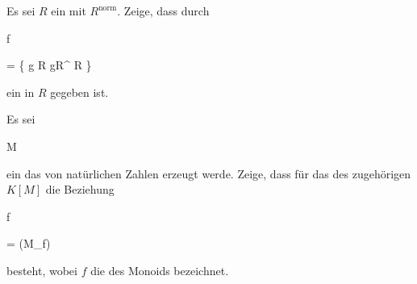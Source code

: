 {} {}



{}

{


Es sei $R$ ein
mit
$R ^{\operatorname{norm} }$. Zeige, dass durch


\mavergleichskettedisp

{\vergleichskette

{ {\mathfrak f}
}

{ =} { \left\{  g \in R   \mid   gR^{ } \subseteq R         \right\}
}

{ } {
}

{ } {
}

{ } {
}

}
{}{}{}
ein
in $R$ gegeben ist.


}

{} {}



{}

{


Es sei


\mavergleichskette

{\vergleichskette

{ M
}

{ \subseteq }{ \N
}

{  }{
}

{    }{
}

{   }{
}

}
{}{}{}
ein
das von
natürlichen Zahlen erzeugt werde. Zeige, dass für das
des zugehörigen
$K[M]$ die Beziehung


\mavergleichskettedisp

{\vergleichskette

{ {\mathfrak f}
}

{ =} { (M_{\geq f})
}

{ } {
}

{ } {
}

{ } {
}

}
{}{}{}
besteht, wobei $f$ die
des Monoids bezeichnet.


}

{} {}



